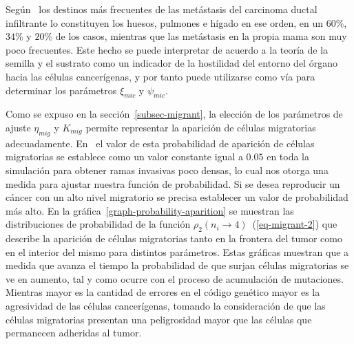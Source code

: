 Seg\'un~\cite{kuhn,isogenic} los destinos m\'as frecuentes de las met\'astasis del carcinoma ductal infiltrante lo constituyen los huesos, pulmones e h\'igado en ese orden, en un $60\%$, $34\%$ y $20\%$ de los casos, mientras que las met\'astasis en la propia mama son muy poco frecuentes. Este hecho se puede interpretar de acuerdo a la teor\'ia de la semilla y el sustrato como un indicador de la hostilidad del entorno del \'organo hacia las c\'elulas cancer\'igenas, y por tanto puede utilizarse como v\'ia para determinar los par\'ametros $\xi_{mic}$ y $\psi_{mic}$. 

Como se expuso en la secci\'on~\ref{subsec-migrant}, la elecci\'on de los par\'ametros de ajuste $\eta_{mig}$ y $K_{mig}$ permite representar la aparici\'on de c\'elulas migratorias adecuadamente. En~\cite{kansal3} el valor de esta probabilidad de aparici\'on de c\'elulas migratorias se establece como un valor constante igual a $0$.$05$ en toda la simulaci\'on para obtener ramas invasivas poco densas, lo cual nos otorga una medida para ajustar nuestra funci\'on de probabilidad. Si se desea reproducir un c\'ancer con un alto nivel migratorio se precisa establecer un valor de probabilidad m\'as alto. En la gr\'afica~\ref{graph-probability-aparition} se muestran las distribuciones de probabilidad de la funci\'on $\rho_2(n_i \rightarrow 4)$~(\ref{eq-migrant-2}) que describe la aparici\'on de c\'elulas migratorias tanto en la frontera del tumor como en el interior del mismo para distintos par\'ametros. Estas gr\'aficas muestran que a medida que avanza el tiempo la probabilidad de que surjan c\'elulas migratorias se ve en aumento, tal y como ocurre con el proceso de acumulaci\'on de mutaciones. Mientras mayor es la cantidad de errores en el c\'odigo gen\'etico mayor es la agresividad de las c\'elulas cancer\'igenas, tomando la consideraci\'on de que las c\'elulas migratorias presentan una peligrosidad mayor que las c\'elulas que permanecen adheridas al tumor.

